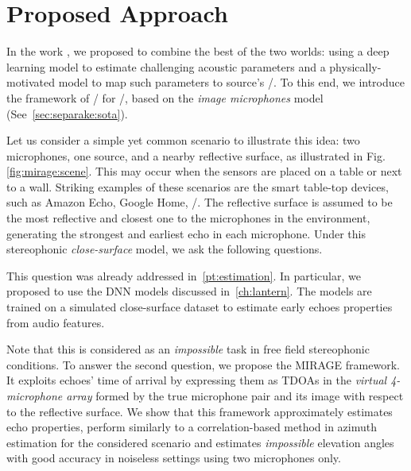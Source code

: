 \section{Proposed Approach}
In the work \cite{di2019mirage}, we proposed to combine the best of the two worlds:
using a deep learning model to estimate challenging acoustic parameters and a physically-motivated model to map such parameters to source's \DOAs/.
To this end, we introduce the framework of \MIRAGEdef/ for \SSL/, based on the \textit{image microphones} model~ (See~\cref{sec:separake:sota}).

\mynewline
Let us consider a simple yet common scenario to illustrate this idea:
two microphones, one source, and a nearby reflective surface, as illustrated in Fig. \cref{fig:mirage:scene}.
This may occur when the sensors are placed on a table or next to a wall.
Striking examples of these scenarios are the smart table-top devices, such as Amazon Echo, Google Home, \etc/.
The reflective surface is assumed to be the most reflective and closest one to the microphones in the environment, generating the strongest and earliest echo in each microphone.
Under this stereophonic \textit{close-surface} model, we ask the following questions.

This question was already addressed in~\cref{pt:estimation}.
In particular, we proposed to use the \ac{DNN} models discussed in~\cref{ch:lantern}.
The models are trained on a simulated close-surface dataset to estimate early echoes properties from audio features.

Note that this is considered as an \textit{impossible} task in free field stereophonic conditions.
To answer the second question, we propose the \ac{MIRAGE} framework.
It exploits echoes' time of arrival by expressing them as \acp{TDOA} in the \textit{virtual 4-microphone array} formed by the true microphone pair and its image with respect to the reflective surface.
We show that this framework approximately estimates echo properties, perform similarly to a correlation-based method in azimuth estimation for the considered
scenario and estimates \textit{impossible} elevation angles with good accuracy in noiseless settings using two microphones only.


